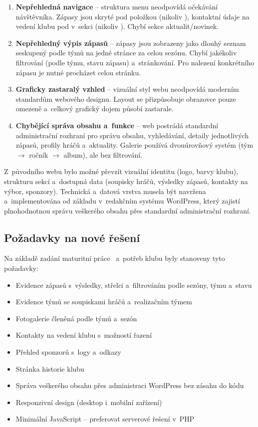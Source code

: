 \documentclass[12pt,a4paper]{article}
\begin{document}
\begin{enumerate}
    \item \textbf{Nepřehledná navigace} -- struktura menu neodpovídá očekávání návštěvníka. Zápasy jsou skryté pod položkou  (nikoliv ), kontaktní údaje na vedení klubu pod  v~sekci  (nikoliv ). Chybí sekce aktualit/novinek.

    \item \textbf{Nepřehledný výpis zápasů} -- zápasy jsou zobrazeny jako dlouhý seznam seskupený podle týmů na jedné stránce za celou sezónu. Chybí jakékoliv filtrování (podle týmu, stavu zápasu) a~stránkování. Pro nalezení konkrétního zápasu je nutné procházet celou stránku.

    \item \textbf{Graficky zastaralý vzhled} -- vizuální styl webu neodpovídá moderním standardům webového designu. Layout se přizpůsobuje obrazovce pouze omezeně a~celkový grafický dojem působí zastarale.

    \item \textbf{Chybějící správa obsahu a~funkce} -- web postrádá standardní administrační rozhraní pro správu obsahu, vyhledávání, detaily jednotlivých zápasů, profily hráčů a~aktuality. Galerie používá dvouúrovňový systém (tým $\rightarrow$ ročník $\rightarrow$ album), ale bez filtrování.
\end{enumerate}

Z~původního webu bylo možné převzít vizuální identitu (logo, barvy klubu), strukturu sekcí a~dostupná data (soupisky hráčů, výsledky zápasů, kontakty na výbor, sponzory). Technická a~datová vrstva musela být navržena a~implementována od základu v~redakčním systému WordPress, který zajistí plnohodnotnou správu veškerého obsahu přes standardní administrační rozhraní.

\subsection{Požadavky na nové řešení}

Na základě zadání maturitní práce~\cite{zadani} a~potřeb klubu byly stanoveny tyto požadavky:

\begin{itemize}
    \item Evidence zápasů s~výsledky, střelci a~filtrováním podle sezóny, týmu a~stavu
    \item Evidence týmů se soupiskami hráčů a~realizačním týmem
    \item Fotogalerie členěná podle týmů a~sezón
    \item Kontakty na vedení klubu s~možností řazení
    \item Přehled sponzorů s~logy a~odkazy
    \item Stránka historie klubu
    \item Správa veškerého obsahu přes administraci WordPress bez zásahu do kódu
    \item Responzivní design (desktop i~mobilní zařízení)
    \item Minimální JavaScript -- preferovat serverové řešení v~PHP
\end{itemize}
\end{document}
